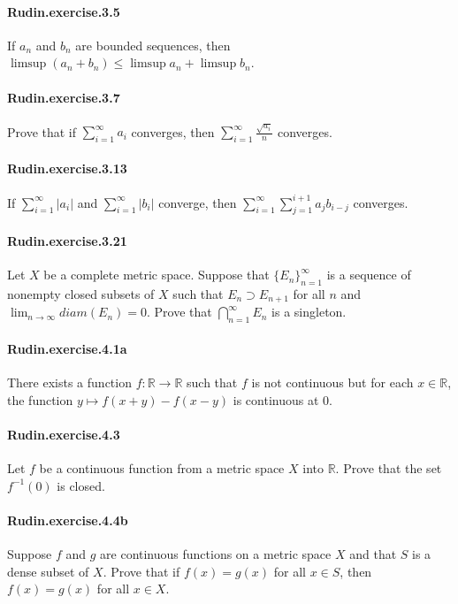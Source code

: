 \documentclass{article}
\begin{document}
\paragraph{Rudin.exercise.3.5} If $a_n$ and $b_n$ are bounded sequences, then $\limsup(a_n+b_n)\leq \limsup a_n + \limsup b_n$.

\paragraph{Rudin.exercise.3.7} Prove that if $\sum_{i=1}^\infty a_i$ converges, then $\sum_{i=1}^\infty \frac{\sqrt{a_i}}{n}$ converges.

\paragraph{Rudin.exercise.3.13} If $\sum_{i=1}^\infty |a_i|$ and $\sum_{i=1}^\infty |b_i|$ converge, then $\sum_{i=1}^\infty \sum_{j=1}^{i+1} a_jb_{i-j}$ converges.

\paragraph{Rudin.exercise.3.21} Let $X$ be a complete metric space. Suppose that $\{E_n\}_{n=1}^\infty$ is a sequence of nonempty closed subsets of $X$ such that $E_n\supset E_{n+1}$ for all $n$ and $\lim_{n\to\infty} diam(E_n)=0$. Prove that $\bigcap_{n=1}^\infty E_n$ is a singleton.

\paragraph{Rudin.exercise.4.1a} There exists a function $f:\mathbb{R}\to\mathbb{R}$ such that $f$ is not continuous but for each $x\in\mathbb{R}$, the function $y\mapsto f(x+y)-f(x-y)$ is continuous at $0$.

\paragraph{Rudin.exercise.4.3} Let $f$ be a continuous function from a metric space $X$ into $\mathbb{R}$. Prove that the set $f^{-1}(0)$ is closed.

\paragraph{Rudin.exercise.4.4b} Suppose $f$ and $g$ are continuous functions on a metric space $X$ and that $S$ is a dense subset of $X$. Prove that if $f(x)=g(x)$ for all $x \in S$, then $f(x)=g(x)$ for all $x \in X$.
\end{document}
